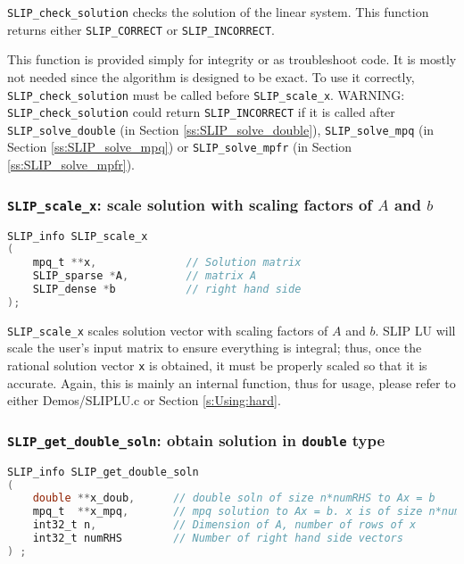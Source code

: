 \documentclass[12pt]{article}
\theoremstyle{definition}
\begin{document}
\verb|SLIP_check_solution| checks the solution of the linear system. This function returns either \verb|SLIP_CORRECT| or \verb|SLIP_INCORRECT|.

This function is provided simply for integrity or as troubleshoot code. It is mostly not needed since the algorithm is designed to be exact. To use it correctly, \verb|SLIP_check_solution| must be called before \verb|SLIP_scale_x|. WARNING: \verb|SLIP_check_solution| could return \verb|SLIP_INCORRECT| if it is called after \verb|SLIP_solve_double| (in Section \ref{ss:SLIP_solve_double}), \verb|SLIP_solve_mpq| (in Section \ref{ss:SLIP_solve_mpq}) or \verb|SLIP_solve_mpfr| (in Section \ref{ss:SLIP_solve_mpfr}).


\cprotect\subsubsection{\verb|SLIP_scale_x|: scale solution with scaling factors of $A$ and $b$}\label{ss:SLIP_scale_x}


\begin{lstlisting}[language=C,frame=single]
SLIP_info SLIP_scale_x
(
    mpq_t **x,              // Solution matrix
    SLIP_sparse *A,         // matrix A
    SLIP_dense *b           // right hand side
);
\end{lstlisting}

\verb|SLIP_scale_x| scales solution vector with scaling factors of $A$ and $b$. SLIP LU will scale the user's input matrix to ensure everything is integral; thus, once the rational solution vector \verb|x| is obtained, it must be properly scaled so that it is accurate. Again, this is mainly an internal function, thus for usage, please refer to either Demos/SLIPLU.c or Section \ref{s:Using:hard}.


\cprotect\subsubsection{\verb|SLIP_get_double_soln|: obtain solution in \verb|double| type}\label{ss:get_double_soln}

\begin{lstlisting}[language=C,frame=single]
SLIP_info SLIP_get_double_soln
(
    double **x_doub,      // double soln of size n*numRHS to Ax = b
    mpq_t  **x_mpq,       // mpq solution to Ax = b. x is of size n*numRHS
    int32_t n,            // Dimension of A, number of rows of x
    int32_t numRHS        // Number of right hand side vectors
) ;
\end{lstlisting}
\end{document}
